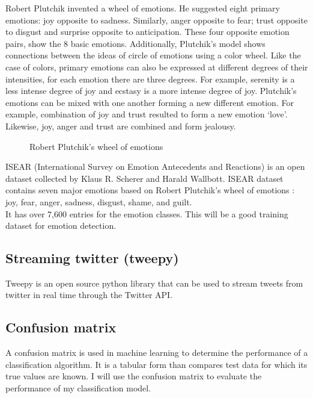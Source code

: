 Robert Plutchik invented a wheel of emotions. He suggested eight primary emotions: joy opposite to sadness. Similarly, anger opposite to fear; trust opposite to disgust and surprise opposite to anticipation. These four opposite emotion pairs, show the 8 basic emotions. Additionally, Plutchik’s model shows connections between the ideas of circle of emotions using a color wheel. Like the case of colors, primary emotions can also be expressed at different degrees of their intensities, for each emotion there are three degrees. For example, serenity is a less intense degree of joy
and ecstasy is a more intense degree of joy. Plutchik’s emotions can be mixed with one another
forming a new different emotion. For example, combination of joy and trust resulted to form a new
emotion ‘love’. Likewise, joy, anger and trust are combined and form jealousy\cite{ref:4}.

\begin{figure}[h]
  \centering
  \caption[Robert Plutchik's wheel of emotions]%
  {Robert Plutchik's wheel of emotions}
  \label{fig:ALAP:sm3}
\end{figure}


ISEAR (International Survey on Emotion Antecedents and Reactions) is an open dataset collected by Klaus R. Scherer and Harald Wallbott. 
ISEAR dataset contains seven major emotions based on Robert Plutchik's wheel of emotions : joy, fear, anger, sadness, disgust, shame, and guilt.\\
It has over 7,600 entries for the emotion classes. This will be a good training dataset for emotion detection.
\clearpage

\subsection{Streaming twitter (tweepy)}
Tweepy is an open source python library that can be used to stream tweets from twitter in real time through the Twitter API.


\subsection{Confusion matrix}
A confusion matrix is used in machine learning to determine the performance of a classification algorithm. It is a tabular form than compares test data for which its true values are known. I will use the confusion matrix to evaluate the performance of my classification model.

